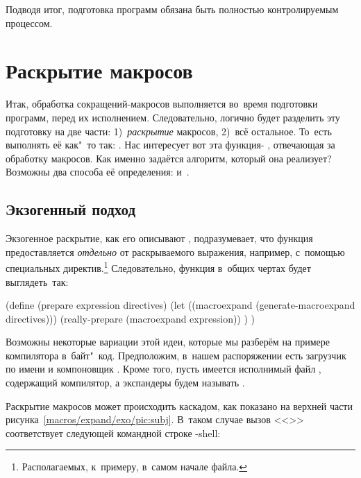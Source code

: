 Подводя итог, подготовка программ обязана быть полностью контролируемым
процессом.


\section{Раскрытие макросов}\label{macros/sect:expand}

Итак, обработка сокращений-макросов выполняется во~время подготовки программ,
перед их исполнением. Следовательно, логично будет разделить эту подготовку на
две части: 1)~\emph{раскрытие} макросов, 2)~всё остальное. То~есть выполнять её
как"~то так: . Нас интересует
вот эта функция- , отвечающая за обработку
макросов. Как именно задаётся алгоритм, который она реализует? Возможны два
способа её определения:  и~.


\subsection{Экзогенный подход}\label{macros/expand/ssect:exo}

Экзогенное раскрытие, как его описывают \cite{qp91b,dps94b}, подразумевает, что
функция  предоставляется \emph{отдельно} от раскрываемого
выражения, например, с~помощью специальных директив.\footnote*{Располагаемых,
к~примеру, в~самом начале файла.} Следовательно, функция  в~общих
чертах будет выглядеть~так:

\begin{code:lisp}
(define (prepare expression directives)
  (let ((macroexpand (generate-macroexpand directives)))
    (really-prepare (macroexpand expression)) ) )
\end{code:lisp}

Возможны некоторые вариации этой идеи, которые мы разберём на примере
компилятора в~байт"~код.  Предположим,
в~нашем распоряжении есть загрузчик по имени  и компоновщик
. Кроме того, пусть имеется исполнимый файл
, содержащий компилятор, а экспандеры будем называть
.

Раскрытие макросов может происходить каскадом, как показано на верхней части
рисунка~\ref{macros/expand/exo/pic:subj}. В~таком случае вызов <<>> соответствует следующей командной строке \UNIX-shell:

